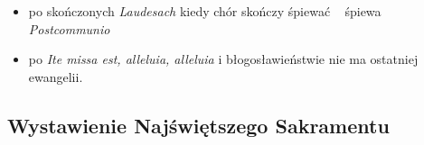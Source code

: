 \begin{itemize}
\begin{itemize}
\begin{itemize}
			            \item kiedy chór zakończy śpiew Antyfony, \ii~ intonuje
			                  Antyfonę do Kantyku Zachariasza (\textit{Et valde
				                  mane}), a dalej śpiewa chór
			            \item następnie \ii~ czyta, a chór śpiewa Kantyk
			                  Zachariasza (\textit{Benedictus Dominus})
			                  \footnote{żegnamy się kiedy chór śpiewa
				                  \textit{Benedictus}, czyli na początku Kantyku}
			            \item kiedy \ii~ skończy czytać następuje normalne
			                  zasypanie i okadzenie ołtarza oraz usługujących i
			                  wiernych (tak jak podczas ofiarowania z
			                  wyłączeniem okadzenia darów)
			            \item \textit{Gloria Patri} w Kantyku scholi wolno
			                  zaśpiewać dopiero wtedy, gdy \tt1 okadzi już
			                  wszystkich
		            \end{itemize}
		      \item po skończonych \textit{Laudesach} kiedy chór skończy śpiewać
		            \ii~ śpiewa \textit{Postcommunio}
		      \item po \textit{Ite missa est, alleluia, alleluia} i błogosławieństwie nie
		            ma ostatniej ewangelii.
	      \end{itemize}
\end{itemize}

\subsection{Wystawienie Najświętszego Sakramentu}

